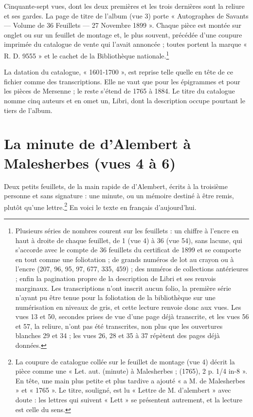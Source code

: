 \documentclass[11pt,a4paper]{article}
\begin{document}
Cinquante-sept vues, dont les deux premières et les trois dernières sont la
reliure et ses gardes. La page de titre de l'album (vue 3) porte « Autographes
de Savants — Volume de 36 Feuillets — 27 Novembre 1899 ». Chaque pièce est
montée sur onglet ou sur un feuillet de montage et, le plus souvent, précédée
d'une coupure imprimée du catalogue de vente qui l'avait annoncée ; toutes
portent la marque « R. D. 9555 » et le cachet de la Bibliothèque
nationale.\footnote{Plusieurs séries de nombres courent sur les feuillets :
un chiffre à l'encre en haut à droite de chaque feuillet, de 1 (vue 4) à 36
(vue 54), sans lacune, qui s'accorde avec le compte de 36 feuillets du
certificat de 1899 et se comporte en tout comme une foliotation ; de grands
numéros de lot au crayon ou à l'encre (207, 96, 95, 97, 677, 335, 459) ; des
numéros de collections antérieures ; enfin la pagination propre de la
description de Libri et ses renvois marginaux. Les transcriptions n'ont
inscrit aucun folio, la première série n'ayant pu être tenue pour la
foliotation de la bibliothèque sur une numérisation en niveaux de gris, et
cette lecture renvoie donc aux vues. Les vues 13 et 50, secondes prises de vue d'une page déjà transcrite, et
les vues 56 et 57, la reliure, n'ont pas été transcrites, non plus que les
ouvertures blanches 29 et 34 ; les vues 26, 28 et 35 à 37 répètent des pages
déjà données.}

La datation du catalogue, « 1601-1700 », est reprise telle quelle en tête de
ce fichier comme des transcriptions. Elle ne vaut que pour les épigrammes et
pour les pièces de Mersenne ; le reste s'étend de 1765 à 1884. Le titre du
catalogue nomme cinq auteurs et en omet un, Libri, dont la description occupe
pourtant le tiers de l'album.

\section*{La minute de d'Alembert à Malesherbes (vues 4 à 6)}

Deux petits feuillets, de la main rapide de d'Alembert, écrits à la troisième
personne et sans signature : une minute, ou un mémoire destiné à être remis,
plutôt qu'une lettre.\footnote{La coupure de catalogue collée sur le feuillet
de montage (vue 4) décrit la pièce comme une « Let. aut. (minute) à
Malesherbes ; (1765), 2 p. 1/4 in-8 ». En tête, une main plus petite et plus
tardive a ajouté « a M. de Malesherbes » et « 1765 ». Le titre, souligné, est
lu « Lettre de M. d'alembert » avec doute : les lettres qui suivent « Lett »
se présentent autrement, et la lecture est celle du sens.} En voici le texte
en français d'aujourd'hui.
\end{document}

